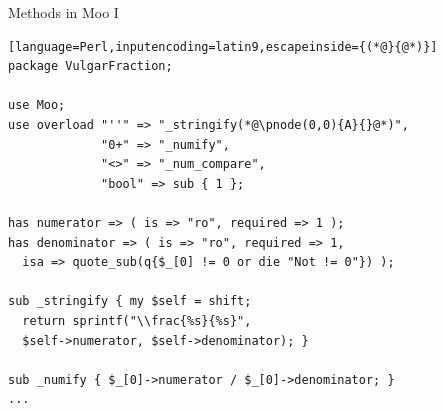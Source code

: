 \documentclass[ngerman,xcolor={table,dvipsnames},scriptsizeer,compress,hyperref={bookmarks,colorlinks}]{beamer}
\begin{document}
\begin{frame}[t,fragile]

\begin{columns}[t]
\begin{column}{.8\textwidth}
\begin{block}{Methods in Moo I}
\scriptsize
\begin{lstlisting}[language=Perl,inputencoding=latin9,escapeinside={(*@}{@*)}]
package VulgarFraction;

use Moo;
use overload "''" => "_stringify(*@\pnode(0,0){A}{}@*)",
             "0+" => "_numify",
             "<>" => "_num_compare",
             "bool" => sub { 1 };

has numerator => ( is => "ro", required => 1 );
has denominator => ( is => "ro", required => 1,
  isa => quote_sub(q{$_[0] != 0 or die "Not != 0"}) );

sub _stringify { my $self = shift;
  return sprintf("\\frac{%s}{%s}",
  $self->numerator, $self->denominator); }

sub _numify { $_[0]->numerator / $_[0]->denominator; }
...
\end{lstlisting}
\end{block}
\end{column}

\begin{column}{.18\textwidth}
\end{column}
\end{columns}


\end{frame}
\end{document}
